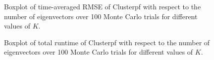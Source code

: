 \documentclass[10pt,letterpaper,final]{article}
\begin{document}
\begin{figure}
\centering
{}
\caption{Boxplot of time-averaged RMSE of Clusterpf with respect to the number of eigenvectors over 100 Monte Carlo trials for different values of $K$.}
\label{fig:RMSE_NbClusters}
\end{figure}

\begin{figure}
\centering
{}
\caption{Boxplot of total runtime of Clusterpf with respect to the number of eigenvectors over 100 Monte Carlo trials for different values of $K$.}
\label{fig:runtime_NbClusters}
\end{figure}
\end{document}
